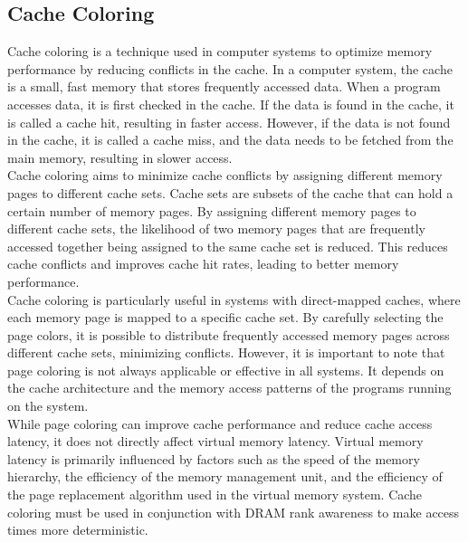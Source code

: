 \documentclass[a4paper, 11pt, twocolumn]{article}
\theoremstyle{nonumberplain}
\begin{document}
\subsection{Cache Coloring}
Cache coloring is a technique used in computer systems to optimize memory
performance by reducing conflicts in the cache. In a computer system,
the cache is a small, fast memory that stores frequently accessed data.
When a program accesses data, it is first checked in the cache.
If the data is found in the cache, it is called a cache hit, resulting in
faster access. However, if the data is not found in the cache,
it is called a cache miss, and the data needs to be fetched
from the main memory, resulting in slower access. \\
Cache coloring aims to minimize cache conflicts by assigning
different memory pages to different cache sets. Cache sets are subsets of
the cache that can hold a certain number of memory pages.
By assigning different memory pages to different cache sets,
the likelihood of two memory pages that are frequently
accessed together being assigned to the same cache set is
reduced. This reduces cache conflicts and improves cache hit rates,
leading to better memory performance. \\
Cache coloring is particularly useful in systems with direct-mapped caches,
where each memory page is mapped to a specific cache set. By carefully
selecting the page colors, it is possible to distribute frequently
accessed memory pages across different cache sets, minimizing conflicts.
However, it is important to note that page coloring is not always
applicable or effective in all systems. It depends on the cache architecture
and the memory access patterns of the programs running on the system. \\
While page coloring can improve cache performance and reduce cache access
latency, it does not directly affect virtual memory latency. Virtual memory
latency is primarily influenced by factors such as the speed of the memory
hierarchy, the efficiency of the memory management unit,
and the efficiency of the page replacement algorithm used
in the virtual memory system. Cache coloring must be used in conjunction
with DRAM rank awareness to make access times more deterministic.
\end{document}
